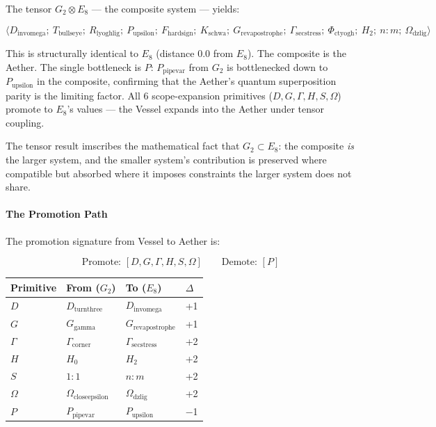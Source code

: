 \documentclass[12pt,a4paper]{article}
\begin{document}
The tensor $G_2 \otimes E_8$ --- the composite system --- yields:

\[\langle D_{\text{invomega}};\ T_{\text{bullseye}};\ R_{\text{lyoghlig}};\ P_{\text{upsilon}};\ F_{\text{hardsign}};\ K_{\text{schwa}};\ G_{\text{revapostrophe}};\ \Gamma_{\text{secstress}};\ \Phi_{\text{ctyogh}};\ H_2;\ n{:}m;\ \Omega_{\text{dzlig}} \rangle\]

This is structurally identical to $E_8$ (distance 0.0 from $E_8$). The composite is the Aether. The single bottleneck is $P$: $P_{\text{pipevar}}$ from $G_2$ is bottlenecked down to $P_{\text{upsilon}}$ in the composite, confirming that the Aether's quantum superposition parity is the limiting factor. All 6 scope-expansion primitives ($D, G, \Gamma, H, S, \Omega$) promote to $E_8$'s values --- the Vessel expands into the Aether under tensor coupling.

The tensor result imscribes the mathematical fact that $G_2 \subset E_8$: the composite \emph{is} the larger system, and the smaller system's contribution is preserved where compatible but absorbed where it imposes constraints the larger system does not share.

\paragraph{The Promotion Path}

The promotion signature from Vessel to Aether is:

\[\text{Promote: } [D, G, \Gamma, H, S, \Omega] \qquad \text{Demote: } [P]\]

\begin{table}[htbp]
\centering
\small
{}
\begin{tabularx}{\textwidth}{>{\centering\arraybackslash}X >{\centering\arraybackslash}X >{\centering\arraybackslash}X >{\centering\arraybackslash}X}
\toprule
\rowcolor{gray!25}\textbf{Primitive} & \textbf{From ($G_2$)} & \textbf{To ($E_8$)} & \textbf{$\Delta$} \\
\midrule
\rowcolors{1}{white}{gray!10}
$D$ & $D_{\text{turnthree}}$ & $D_{\text{invomega}}$ & +1 \\
$G$ & $G_{\text{gamma}}$ & $G_{\text{revapostrophe}}$ & +1 \\
$\Gamma$ & $\Gamma_{\text{corner}}$ & $\Gamma_{\text{secstress}}$ & +2 \\
$H$ & $H_0$ & $H_2$ & +2 \\
$S$ & $1{:}1$ & $n{:}m$ & +2 \\
$\Omega$ & $\Omega_{\text{closeepsilon}}$ & $\Omega_{\text{dzlig}}$ & +2 \\
$P$ & $P_{\text{pipevar}}$ & $P_{\text{upsilon}}$ & $-$1 \\
\bottomrule
\end{tabularx}
\end{table}
\end{document}
